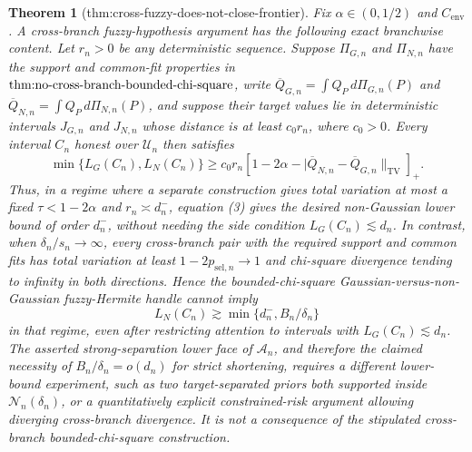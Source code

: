 \documentclass{article}
\newtheorem{theorem}{Theorem}
\begin{document}
\begin{theorem}[thm:cross-fuzzy-does-not-close-frontier]\label{thm:cross-fuzzy-does-not-close-frontier}
Fix \(\alpha\in(0,1/2)\) and \(C_{\mathrm{env}}\).  A cross-branch fuzzy-hypothesis argument has the following exact branchwise content.  Let \(r_n>0\) be any deterministic sequence.  Suppose \(\Pi_{G,n}\) and \(\Pi_{N,n}\) have the support and common-fit properties in \(\textup{thm:no-cross-branch-bounded-chi-square}\), write \(\overline Q_{G,n}=\int Q_P\,d\Pi_{G,n}(P)\) and \(\overline Q_{N,n}=\int Q_P\,d\Pi_{N,n}(P)\), and suppose their target values lie in deterministic intervals \(J_{G,n}\) and \(J_{N,n}\) whose distance is at least \(c_0r_n\), where \(c_0>0\).  Every interval \(C_n\) honest over \(\mathcal U_n\) then satisfies
\[
 \min\{L_G(C_n),L_N(C_n)\}
 \ge c_0r_n
 \left[1-2\alpha-|\overline Q_{N,n}-\overline Q_{G,n}\|_{\mathrm{TV}}\right]_+.
\tag{3}
\]
Thus, in a regime where a separate construction gives total variation at most a fixed \(\tau<1-2\alpha\) and \(r_n\asymp d_n^-\), equation (3) gives the desired non-Gaussian lower bound of order \(d_n^-\), without needing the side condition \(L_G(C_n)\lesssim d_n\).  In contrast, when \(\delta_n/s_n\to\infty\), every cross-branch pair with the required support and common fits has total variation at least \(1-2p_{\mathrm{sel},n}\to1\) and chi-square divergence tending to infinity in both directions.  Hence the bounded-chi-square Gaussian-versus-non-Gaussian fuzzy-Hermite handle cannot imply
\[
 L_N(C_n)\gtrsim\min\{d_n^-,B_n/\delta_n\}
\]
in that regime, even after restricting attention to intervals with \(L_G(C_n)\lesssim d_n\).  The asserted strong-separation lower face of \(\mathcal A_n\), and therefore the claimed necessity of \(B_n/\delta_n=o(d_n)\) for strict shortening, requires a different lower-bound experiment, such as two target-separated priors both supported inside \(\mathcal N_n(\delta_n)\), or a quantitatively explicit constrained-risk argument allowing diverging cross-branch divergence.  It is not a consequence of the stipulated cross-branch bounded-chi-square construction.
\end{theorem}
\end{document}
